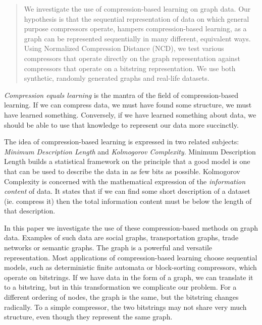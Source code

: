\documentclass{article}
\begin{document}

\begin{abstract}

We investigate the use of compression-based learning on graph data. Our hypothesis is that the sequential representation of data on which general purpose compressors operate, hampers compression-based learning, as a graph can be represented sequentially in many different, equivalent ways. Using Normalized Compression Distance (NCD), we test various compressors that operate directly on the graph representation against compressors that operate on a bitstring representation. We use both synthetic, randomly generated graphs and real-life datasets. 

\end{abstract}

\emph{Compression equals learning} is the mantra of the field of compression-based learning. If we can compress data, we must have found some structure, we must have learned something. Conversely, if we have learned something about data, we should be able to use that knowledge to represent our data more succinctly.

The idea of compression-based learning is expressed in two related subjects: \emph{Minimum Description Length} and \emph{Kolmogorov Complexity}. Minimum Description Length \cite{grunwald2007minimum} builds a statistical framework on the principle that a good model is one that can be used to describe the data in as few bits as possible. Kolmogorov Complexity \cite{li1997introduction} is concerned with the mathematical expression of the \emph{information content} of  data. It states that if we can find some short description of a dataset (ie. compress it) then the total information content must be below the length of that description.

In this paper we investigate the use of these compression-based methods on graph data. Examples of such data are social graphs, transportation graphs, trade networks or semantic graphs. The graph is a powerful and versatile representation. Most applications of compression-based learning choose sequential models, such as deterministic finite automata or block-sorting compressors, which operate on bitstrings. If we have data in the form of a graph, we can translate it to a bitstring, but in this transformation we complicate our problem. For a different ordering of nodes, the graph is the same, but the bitstring changes radically. To a simple compressor, the two bitstrings may not share very much structure, even though they represent the same graph.
\end{document}
